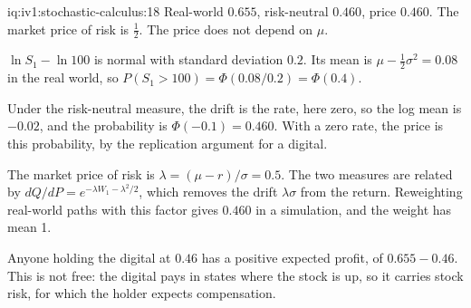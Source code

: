 \begin{solution}{iq:iv1:stochastic-calculus:18}
Real-world $0.655$, risk-neutral $0.460$, price $0.460$. The market price of risk is $\frac12$. The price does not depend on $\mu$.

$\ln S_1 - \ln 100$ is normal with standard deviation $0.2$. Its mean is $\mu - \frac12\sigma^2 = 0.08$ in the real world, so $P(S_1 > 100) = \Phi(0.08/0.2) = \Phi(0.4)$.

Under the risk-neutral measure, the drift is the rate, here zero, so the log mean is $-0.02$, and the probability is $\Phi(-0.1) = 0.460$. With a zero rate, the price is this probability, by the replication argument for a digital.

The market price of risk is $\lambda = (\mu - r)/\sigma = 0.5$. The two measures are related by $dQ/dP = e^{-\lambda W_1 - \lambda^2/2}$, which removes the drift $\lambda\sigma$ from the return. Reweighting real-world paths with this factor gives $0.460$ in a simulation, and the weight has mean 1.

Anyone holding the digital at $0.46$ has a positive expected profit, of $0.655 - 0.46$. This is not free: the digital pays in states where the stock is up, so it carries stock risk, for which the holder expects compensation.



\end{solution}

